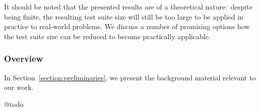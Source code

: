 It should be noted that the presented results are of a theoretical
nature:~despite being finite, the resulting test suite size will still be too
large to be applied in practice to real-world problems. We discuss a number
of promising options how the test suite size can be reduced to become
practically applicable.


\subsubsection*{Overview}
In Section~\ref{section:preliminaries},
we present the background material relevant to our work.

@todo


